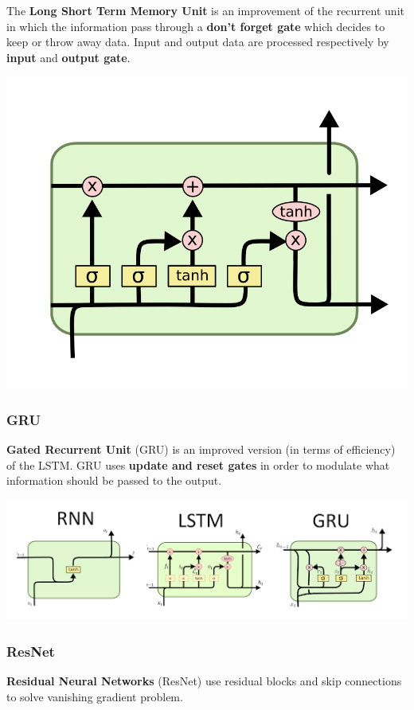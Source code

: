 \documentclass{beamer}
\begin{document}
{\begin{frame}
The \textbf{Long Short Term Memory Unit} is an improvement of the recurrent unit in which the information pass through a \textbf{don't forget gate} which decides to keep or throw away data. Input and output data are processed respectively by \textbf{input} and \textbf{output gate}.

\begin{center}
\includegraphics[scale = 0.5]{lstm.png}
\end{center}

\end{frame}
\begin{frame}
	\frametitle{GRU}
	\textbf{Gated Recurrent Unit} (GRU) is an improved version (in terms of efficiency) of the LSTM. GRU uses \textbf{update and reset gates} in order to modulate what information should be passed to the output.

	\begin{center}
	\includegraphics[scale = 0.6]{gru.png}
         \end{center}
\end{frame}
\begin{frame}
	\frametitle{ResNet}
	\textbf{Residual Neural Networks} (ResNet) use residual blocks and skip connections to solve vanishing gradient problem.


\end{frame}}
\end{document}
